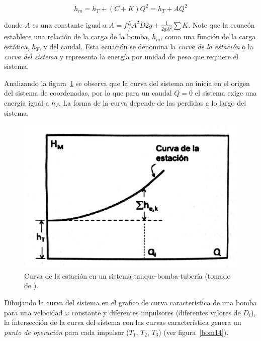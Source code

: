 \documentclass[11pt, oneside]{article}
\begin{document}
\begin{equation}
h_m = h_T + (C+K)Q^2 = h_T +A Q^2
\label{boma16}
\end{equation}

donde $A$ es una constante igual a $A = f\frac{L}/{A^2 D 2 g} + \frac{1}{2g A^2}\sum K$. Note que la ecuac\'on establece una relaci\'on de la carga de la bomba, $h_m$, como una funci\'on de la carga est\'atica, $h_T$, y del caudal. Esta ecuaci\'on se denomina la \emph{curva de la estaci\'on} o la \emph{curva del sistema} y representa la energ\'ia por unidad de peso que requiere el sistema. 

Analizando la figura~\ref{bom13} se observa que la curva del sistema no inicia en el origen del sistema de coordenadas, por lo que para un caudal $Q=0$ el sistema exige una energ\'ia igual a $h_T$. La forma de la curva depende de las perdidas a lo largo del sistema. 

\begin{figure}[h]
\centering
\includegraphics[width=12cm]{./figs/bom13.jpeg}
\caption{Curva de la estaci\'on en un sistema tanque-bomba-tuber\'ia (tomado de \cite{agudelo2011mecanica}).} 
\label{bom13}
\end{figure}

Dibujando la curva del sistema en el grafico de curva caracteristica de una bomba para una velocidad $\omega$ constante y diferentes impulsores (diferentes valores de $D_i$), la intersecci\'on de la curva del sistema con las curvas caracter\'istica genera un \emph{punto de operaci\'on} para cada impulsor ($T_1$, $T_2$, $T_3$) (ver figura~\ref{bom14}).
\end{document}
